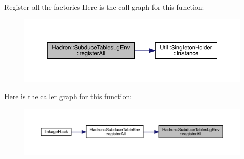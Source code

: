 Register all the factories Here is the call graph for this function\+:\nopagebreak
\begin{figure}[H]
\begin{center}
\leavevmode
\includegraphics[width=350pt]{d7/df2/namespaceHadron_1_1SubduceTablesLgEnv_abb63f9dacfb5b881f3052ce08000b859_cgraph}
\end{center}
\end{figure}
Here is the caller graph for this function\+:
\nopagebreak
\begin{figure}[H]
\begin{center}
\leavevmode
\includegraphics[width=350pt]{d7/df2/namespaceHadron_1_1SubduceTablesLgEnv_abb63f9dacfb5b881f3052ce08000b859_icgraph}
\end{center}
\end{figure}
